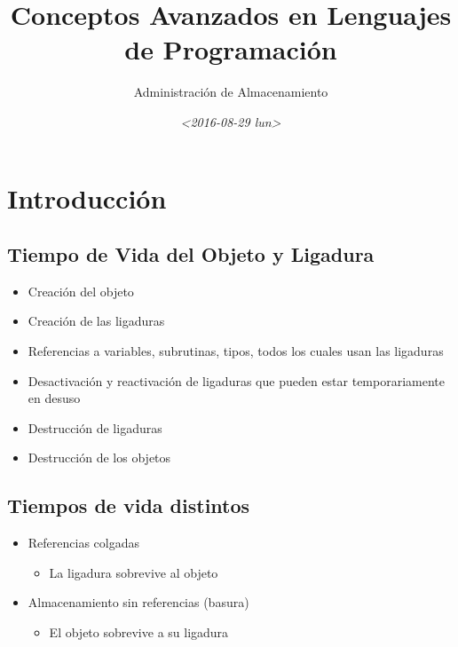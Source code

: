 \documentclass[11pt]{article}
\author{Administración de Almacenamiento}
\date{\textit{<2016-08-29 lun>}}
\title{Conceptos Avanzados en Lenguajes de Programación}
\begin{document}
\maketitle
\tableofcontents


\section*{Introducción}
\label{sec:orgheadline20}

\subsection*{Tiempo de Vida del Objeto y Ligadura}
\label{sec:orgheadline1}
\begin{itemize}
\item Creación del objeto
\item Creación de las ligaduras
\item Referencias a variables, subrutinas, tipos, todos los cuales usan
las ligaduras
\item Desactivación y reactivación de ligaduras que pueden estar
temporariamente en desuso
\item Destrucción de ligaduras
\item Destrucción de los objetos
\end{itemize}

\subsection*{Tiempos de vida distintos}
\label{sec:orgheadline2}
\begin{itemize}
\item Referencias colgadas
\begin{itemize}
\item La ligadura sobrevive al objeto
\end{itemize}
\item Almacenamiento sin referencias (basura)
\begin{itemize}
\item El objeto sobrevive a su ligadura
\end{itemize}
\end{itemize}
\end{document}
